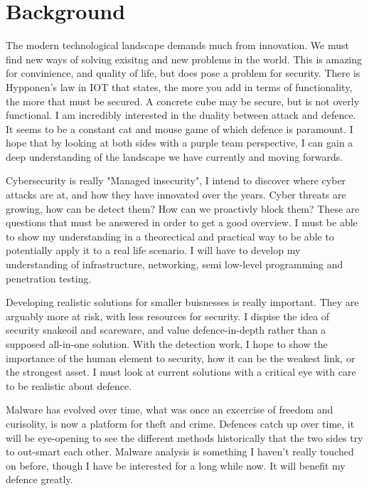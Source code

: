 
\section{Background}
The modern technological landscape demands much from innovation. 
We must find new ways of solving exisitng and new problems in the world. 
This is amazing for convinience, and quality of life, but does pose a problem for security. 
There is Hypponen's law in IOT that states, the more you add in terms of functionality, the more that must be secured. 
A concrete cube may be secure, but is not overly functional. I am incredibly interested in the duality between attack and defence. 
It seems to be a constant cat and mouse game of which defence is paramount. 
I hope that by looking at both sides with a purple team perspective, I can gain a deep understanding of the landscape we have currently and moving forwards. 

Cybersecurity is really "Managed insecurity", I intend to discover where cyber attacks are at, and how they have innovated over the years.
Cyber threats are growing, how can be detect them? How can we proactivly block them? These are questions that must be answered in order to get a good overview.
I must be able to show my understanding in a theorectical and practical way to be able to potentially apply it to a real life scenario. 
I will have to develop my understanding of infrastructure, networking, semi low-level programming and penetration testing.

Developing realistic solutions for smaller buisnesses is really important. They are arguably more at risk, with less resources for security. 
I dispise the idea of security snakeoil and scareware, and value defence-in-depth rather than a supposed all-in-one solution.
With the detection work, I hope to show the importance of the human element to security, how it can be the weakest link, or the strongest asset. 
I must look at current solutions with a critical eye with care to be realistic about defence. 

Malware has evolved over time, what was once an excercise of freedom and curisolity, is now a platform for theft and crime. 
Defences catch up over time, it will be eye-opening to see the different methods historically that the two sides try to out-smart each other.
Malware analysis is something I haven't really touched on before, though I have be interested for a long while now. It will benefit my defence greatly.


